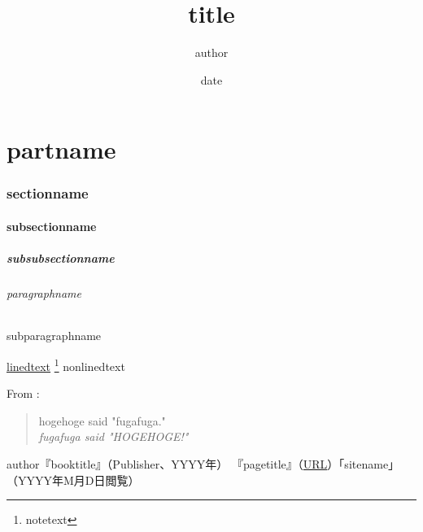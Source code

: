 \documentclass[a4paper,11pt,titlepage]{ltjsarticle} %
\begin{document}
\title{title} %
\author{author} %
\date{date} %
\maketitle %

\tableofcontents %


\newpage %

\part{partname} %
\section{sectionname} %
\subsection{subsectionname} %
\subsubsection{subsubsectionname} %
\paragraph{paragraphname} %
\subparagraph{subparagraphname} %

\underline{linedtext}
\footnote{notetext} %
nonlinedtext

From \cite{keyname1}: %
\begin{quote}
  hogehoge said "fugafuga."\\
  \emph{fugafuga said "HOGEHOGE!"}\\ %
\end{quote}


\begin{thebibliography}{99} %
   author『booktitle』（Publisher、YYYY年）
   『pagetitle』（\url{URL}）「sitename」（YYYY年M月D日閲覧）
\end{thebibliography}
\end{document}
